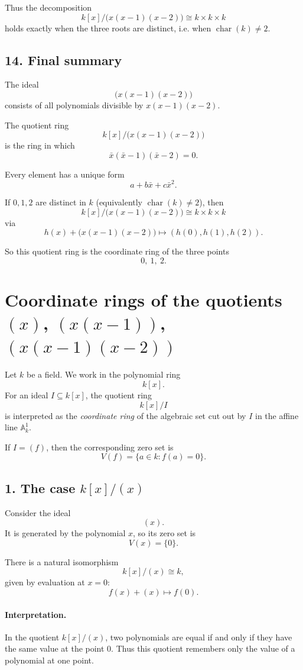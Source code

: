 \documentclass[12pt,a4paper]{article}
\theoremstyle{notespace}
\begin{document}
Thus the decomposition
\[
k[x]/\bigl(x(x-1)(x-2)\bigr)\cong k\times k\times k
\]
holds exactly when the three roots are distinct, i.e. when \(\operatorname{char}(k)\neq 2\).

\subsection*{14. Final summary}

The ideal
\[
\bigl(x(x-1)(x-2)\bigr)
\]
consists of all polynomials divisible by \(x(x-1)(x-2)\).

The quotient ring
\[
k[x]/\bigl(x(x-1)(x-2)\bigr)
\]
is the ring in which
\[
\bar x(\bar x-1)(\bar x-2)=0.
\]

Every element has a unique form
\[
a+b\bar x+c\bar x^2.
\]

If \(0,1,2\) are distinct in \(k\) (equivalently \(\operatorname{char}(k)\neq 2\)), then
\[
k[x]/\bigl(x(x-1)(x-2)\bigr)\cong k\times k\times k
\]
via
\[
h(x)+\bigl(x(x-1)(x-2)\bigr)\longmapsto (h(0),h(1),h(2)).
\]

So this quotient ring is the coordinate ring of the three points
\[
0,\ 1,\ 2.
\]	
	
	
\section*{Coordinate rings of the quotients \((x)\), \((x(x-1))\), \((x(x-1)(x-2))\)}

Let \(k\) be a field. We work in the polynomial ring
\[
k[x].
\]
For an ideal \(I\subseteq k[x]\), the quotient ring
\[
k[x]/I
\]
is interpreted as the \emph{coordinate ring} of the algebraic set cut out by \(I\) in the affine line \(\mathbb A_k^1\).

If \(I=(f)\), then the corresponding zero set is
\[
V(f)=\{a\in k : f(a)=0\}.
\]

\subsection*{1. The case \(k[x]/(x)\)}

Consider the ideal
\[
(x).
\]
It is generated by the polynomial \(x\), so its zero set is
\[
V(x)=\{0\}.
\]

There is a natural isomorphism
\[
k[x]/(x)\cong k,
\]
given by evaluation at \(x=0\):
\[
f(x)+(x)\longmapsto f(0).
\]

\paragraph{Interpretation.}
In the quotient \(k[x]/(x)\), two polynomials are equal if and only if they have the same value at the point \(0\). Thus this quotient remembers only the value of a polynomial at one point.
\end{document}
